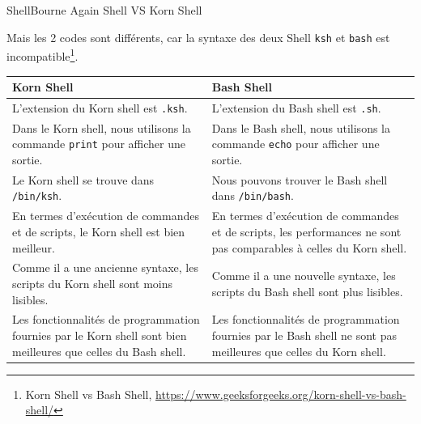 \documentclass{beamer}
\begin{document}
    \begin{frame}{Shell}{Bourne Again Shell VS Korn Shell}
        \begin{tiny}
            Mais les 2 codes sont différents, car la syntaxe des deux Shell \lstinline{ksh} et \lstinline{bash} est incompatible\footnote{Korn Shell vs Bash Shell, \url{https://www.geeksforgeeks.org/korn-shell-vs-bash-shell/}}.
            \begin{table}[h!]
                \centering
                \begin{tabular}{|p{5.5cm}|p{5.5cm}|}
                    \hline
                    \textbf{Korn Shell}                                                                                            & \textbf{Bash Shell}                                                                                                \\
                    \hline
                    L'extension du Korn shell est \lstinline{.ksh}.                                                                & L'extension du Bash shell est \lstinline{.sh}.                                                                     \\
                    \hline
                    Dans le Korn shell, nous utilisons la commande \lstinline{print} pour afficher une sortie. & Dans le Bash shell, nous utilisons la commande \lstinline{echo} pour afficher une sortie. \\
                    \hline
                    Le Korn shell se trouve dans \lstinline{/bin/ksh}.                                                             & Nous pouvons trouver le Bash shell dans \lstinline{/bin/bash}.                                                     \\
                    \hline
                    En termes d'exécution de commandes et de scripts, le Korn shell est bien meilleur. & En termes d'exécution de commandes et de scripts, les performances ne sont pas comparables à celles du Korn shell. \\
                    \hline
                    Comme il a une ancienne syntaxe, les scripts du Korn shell sont moins lisibles.                                & Comme il a une nouvelle syntaxe, les scripts du Bash shell sont plus lisibles.                                     \\
                    \hline
                    Les fonctionnalités de programmation fournies par le Korn shell sont bien meilleures que celles du Bash shell. & Les fonctionnalités de programmation fournies par le Bash shell ne sont pas meilleures que celles du Korn shell. \\

\end{tabular}
\end{table}
\end{tiny}
\end{frame}
\end{document}
